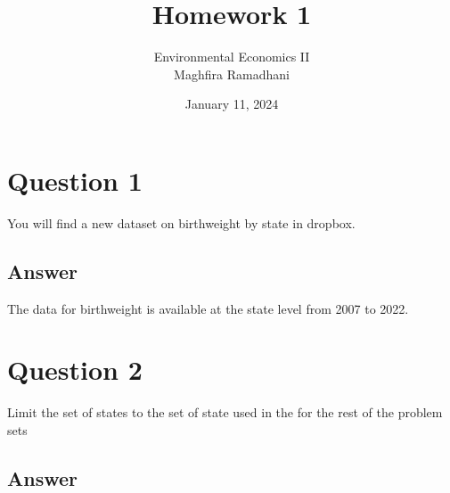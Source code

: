 \documentclass[11pt]{article}
\newcommand{\bib}{bibliography.bib}
\begin{document}
 
\title{Homework 1}
\author{Environmental Economics II\\
Maghfira Ramadhani}
\date{January 11, 2024}
\maketitle

\section*{Question 1}
You will find a new dataset on birthweight by state in dropbox.
\subsection*{Answer}
The data for birthweight is available at the state level from 2007 to 2022.
\section*{Question 2}
Limit the set of states to the set of state used in the \cite{black2022simulated} for the rest of the problem sets
\subsection*{Answer}



\end{document}
